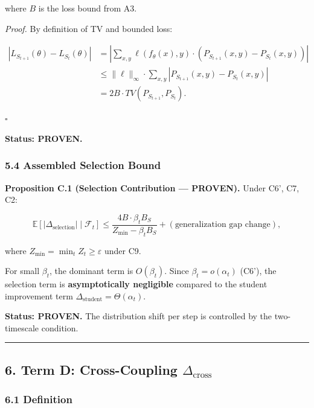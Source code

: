 \documentclass[
  12pt,
]{article}
\begin{document}
where \(B\) is the loss bound from A3.

\emph{Proof.} By definition of TV and bounded loss:

\[\begin{aligned}
|L_{S_{t+1}}(\theta) - L_{S_t}(\theta)| &= \left|\sum_{x,y} \ell(f_\theta(x), y) \cdot (P_{S_{t+1}}(x,y) - P_{S_t}(x,y))\right| \\
&\leq \|\ell\|_\infty \cdot \sum_{x,y} |P_{S_{t+1}}(x,y) - P_{S_t}(x,y)| \\
&= 2B \cdot TV(P_{S_{t+1}}, P_{S_t}).
\end{aligned}\]

\(\square\)

\textbf{Status: PROVEN.}

\subsubsection{5.4 Assembled Selection
Bound}\label{assembled-selection-bound}

\textbf{Proposition C.1 (Selection Contribution --- PROVEN).} Under C6',
C7, C2:

\[\mathbb{E}[|\Delta_{\text{selection}}| \mid \mathcal{F}_t] \leq \frac{4B \cdot \beta_t B_S}{Z_{\min} - \beta_t B_S} + (\text{generalization gap change}),\]

where \(Z_{\min} = \min_t Z_t \geq \varepsilon\) under C9.

For small \(\beta_t\), the dominant term is \(O(\beta_t)\). Since
\(\beta_t = o(\alpha_t)\) (C6'), the selection term is
\textbf{asymptotically negligible} compared to the student improvement
term \(\Delta_{\text{student}} = \Theta(\alpha_t)\).

\textbf{Status: PROVEN.} The distribution shift per step is controlled
by the two-timescale condition.

\begin{center}\rule{0.5\linewidth}{0.5pt}\end{center}

\subsection{\texorpdfstring{6. Term D: Cross-Coupling
\(\Delta_{\text{cross}}\)}{6. Term D: Cross-Coupling \textbackslash Delta\_\{\textbackslash text\{cross\}\}}}\label{term-d-cross-coupling-delta_textcross}

\subsubsection{6.1 Definition}\label{definition-1}
\end{document}
